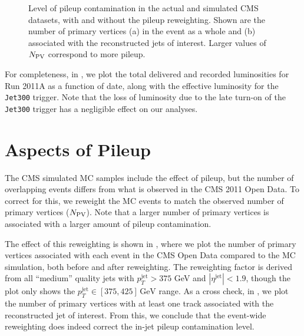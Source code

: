 \documentclass[aps,prd,twocolumn,preprintnumbers,nofootinbib,longbibliography,floatfix,superscriptaddress]{revtex4-1}
\begin{document}
\begin{figure*}[t]
  \centering
    \caption{
    Level of pileup contamination in the actual and simulated CMS datasets, with and without the pileup reweighting.
    Shown are the number of primary vertices (a) in the event as a whole and (b) associated with the reconstructed jets of interest. 
    Larger values of $N_{\rm PV}$ correspond to more pileup.
    }
    \label{figure:NPVhistogram_both}
\end{figure*}

For completeness, in , we plot the total delivered and recorded luminosities for Run 2011A as a function of date, along with the effective luminosity for the \texttt{Jet300} trigger.
%
Note that the loss of luminosity due to the late turn-on of the \texttt{Jet300} trigger has a negligible effect on our analyses.



\section{Aspects of Pileup}
\label{app:pileupreweighting}


The CMS simulated MC samples include the effect of pileup, but the number of overlapping events differs from what is observed in the CMS 2011 Open Data.
%
To correct for this, we reweight the MC events to match the observed number of primary vertices ($N_{\rm PV}$).
%
Note that a larger number of primary vertices is associated with a larger amount of pileup contamination.


The effect of this reweighting is shown in , where we plot the number of primary vertices associated with each event in the CMS Open Data compared to the MC simulation, both before and after reweighting.
%
The reweighting factor is derived from all ``medium'' quality jets with $p_T^\text{jet}> 375$ GeV and $|\eta^\text{jet}|<1.9$, though the plot only shows the $p_T^\text{jet} \in [375,425]\,\text{GeV}$ range.
%
As a cross check, in , we plot the number of primary vertices with at least one track associated with the reconstructed jet of interest.
%
From this, we conclude that the event-wide reweighting does indeed correct the in-jet pileup contamination level.
\end{document}
